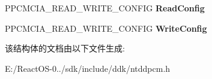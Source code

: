 \begin{DoxyCompactItemize}
\item 
\mbox{\label{struct___p_c_m_c_i_a___b_u_s___i_n_t_e_r_f_a_c_e___s_t_a_n_d_a_r_d_a2cea2205b8cb3cdaad37253d13234894}} 
P\+P\+C\+M\+C\+I\+A\+\_\+\+R\+E\+A\+D\+\_\+\+W\+R\+I\+T\+E\+\_\+\+C\+O\+N\+F\+IG {\bfseries Read\+Config}
\item 
\mbox{\label{struct___p_c_m_c_i_a___b_u_s___i_n_t_e_r_f_a_c_e___s_t_a_n_d_a_r_d_a71a42d548d6df99dc016e1ec9ac6a205}} 
P\+P\+C\+M\+C\+I\+A\+\_\+\+R\+E\+A\+D\+\_\+\+W\+R\+I\+T\+E\+\_\+\+C\+O\+N\+F\+IG {\bfseries Write\+Config}
\end{DoxyCompactItemize}


该结构体的文档由以下文件生成\+:\begin{DoxyCompactItemize}
\item 
E\+:/\+React\+O\+S-\/0../sdk/include/ddk/ntddpcm.\+h\end{DoxyCompactItemize}
